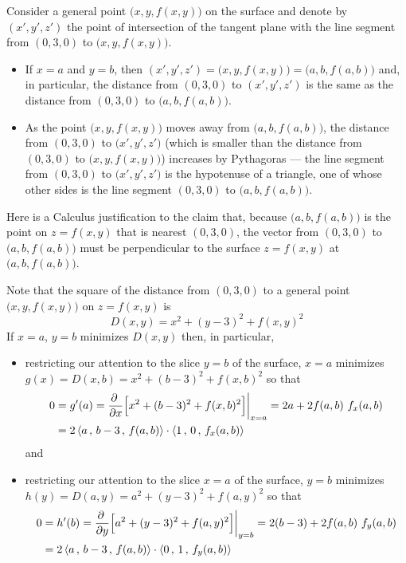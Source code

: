 \begin{eg}[Optional]
{Consider a general point $\big(x,y,f(x,y)\big)$ on the surface and 
denote by $(x',y',z')$ the point of intersection of the tangent plane
with the line segment from $(0,3,0)$ to $\big(x,y,f(x,y)\big)$. 
\begin{itemize}
\item 
If $x=a$ and $y=b$, then $(x',y',z')=\big(x,y,f(x,y)\big)=\big(a,b,f(a,b)\big)$
and, in particular, the distance from $(0,3,0)$ to $(x',y',z')$
is the same as the distance from $(0,3,0)$ to $\big(a,b,f(a,b)\big)$.
\item
As the point $\big(x,y,f(x,y)\big)$ moves away from $\big(a,b,f(a,b)\big)$,
the distance from $(0,3,0)$ to $\big(x',y',z'\big)$ (which is smaller than
the distance from $(0,3,0)$ to $\big(x,y,f(x,y)\big)$)
increases by Pythagoras --- the line segment from 
$(0,3,0)$ to $\big(x',y',z'\big)$ is the hypotenuse of a triangle, one of 
whose other sides is the line segment $(0,3,0)$ to $\big(a,b,f(a,b)\big)$.
\end{itemize}

Here is a Calculus justification to the claim that, because 
$\big(a,b,f(a,b)\big)$ is the point on $z=f(x,y)$ that is nearest 
$(0,3,0)$, the vector from $(0,3,0)$ to $\big(a,b,f(a,b)\big)$ 
must be perpendicular to the surface $z=f(x,y)$ at $\big(a,b,f(a,b)\big)$. 
}%
Note that the square of the distance from $(0,3,0)$ to a general point
$\big(x,y,f(x,y)\big)$ on $z=f(x,y)$ is
\begin{equation*}
D(x,y) = x^2 + (y-3)^2 +f(x,y)^2
\end{equation*}
If $x=a$, $y=b$ minimizes $D(x,y)$ then, in particular, 
\begin{itemize}
\item
  restricting our attention to the slice $y=b$ of the surface,
  $x=a$ minimizes $g(x) = D(x,b) =x^2 + (b-3)^2 +f(x,b)^2$ so that
  \begin{align*}
    0 &= g'(a) =\pdiff{}{x}\Big[x^2 + (b-3)^2 +f(x,b)^2\Big]\bigg|_{x=a}
       =2a +2 f(a,b)\ f_x(a,b) \\
      &=2 \llt a\,,\,b-3\,,\, f(a,b)\rgt\cdot\llt 1\,,\,0\,,\, f_x(a,b)\rgt
  \end{align*}
  and
\item
  restricting our attention to the slice $x=a$ of the surface,
  $y=b$ minimizes $h(y) = D(a,y) =a^2 + (y-3)^2 +f(a,y)^2$ so that
  \begin{align*}
    0 &= h'(b) =\pdiff{}{y}\Big[a^2 + (y-3)^2 +f(a,y)^2\Big]\bigg|_{y=b}
       =2 (b-3) +2 f(a,b)\ f_y(a,b) \\
      &=2 \llt a\,,\,b-3\,,\, f(a,b)\rgt\cdot\llt 0\,,\,1\,,\, f_y(a,b)\rgt
  \end{align*}


\end{itemize}
\end{eg}
